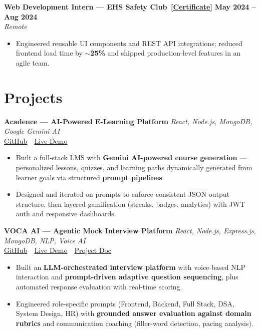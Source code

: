 \documentclass[a4paper,10.5pt]{article}
\newcommand{\resumeSubheading}[4]{%
  \noindent\textbf{\color{accent}#1} \hfill \textbf{\small#2} \\
  \noindent\textit{\small\color{gray}#3} \hfill \textit{\small\color{gray}#4} \vspace{2pt}%
}
\newcommand{\resumeItem}[1]{\item\small #1}
\begin{document}
\vspace{4pt}

\resumeSubheading
{Web Development Intern --- EHS Safety Club \,\href{https://drive.google.com/file/d/1Qdter8Ndw98bpQBjL-DrfLcrUbw5Wf1_/view?usp=sharing}{\small[Certificate]}}{May 2024 -- Aug 2024}
{Remote}{}
\begin{itemize}
  \resumeItem{Engineered reusable UI components and REST API integrations; reduced frontend load time by $\sim$\textbf{25\%} and shipped production-level features in an agile team.}
\end{itemize}

\section*{Projects}

\noindent\textbf{\color{accent}Acadence --- AI-Powered E-Learning Platform}
\hfill \emph{React, Node.js, MongoDB, Google Gemini AI}\\
{\small
  \href{https://github.com/Ishita-coder27/acadence2.0}{GitHub}
  \,\textbar\,
  \href{https://acadence-dashboard-9b46.vercel.app}{Live Demo}
}
\begin{itemize}
  \resumeItem{Built a full-stack LMS with \textbf{Gemini AI-powered course generation} --- personalized lessons, quizzes, and learning paths dynamically generated from learner goals via structured \textbf{prompt pipelines}.}
  \resumeItem{Designed and iterated on prompts to enforce consistent JSON output structure, then layered gamification (streaks, badges, analytics) with JWT auth and responsive dashboards.}
\end{itemize}

\vspace{4pt}

\noindent\textbf{\color{accent}VOCA AI --- Agentic Mock Interview Platform}
\hfill \emph{React, Node.js, Express.js, MongoDB, NLP, Voice AI}\\
{\small
  \href{https://github.com/Ishita-coder27/ai-interviewer}{GitHub}
  \,\textbar\,
  \href{https://mockinterviewerai.netlify.app/}{Live Demo}
  \,\textbar\,
  \href{https://drive.google.com/file/d/1p491yWfbeOLaWvnOIkI6u5gXdy28YbZl/view?usp=sharing}{Project Doc}
}
\begin{itemize}
  \resumeItem{Built an \textbf{LLM-orchestrated interview platform} with voice-based NLP interaction and \textbf{prompt-driven adaptive question sequencing}, plus automated response evaluation with real-time scoring.}
  \resumeItem{Engineered role-specific prompts (Frontend, Backend, Full Stack, DSA, System Design, HR) with \textbf{grounded answer evaluation against domain rubrics} and communication coaching (filler-word detection, pacing analysis).}
\end{itemize}
\end{document}
